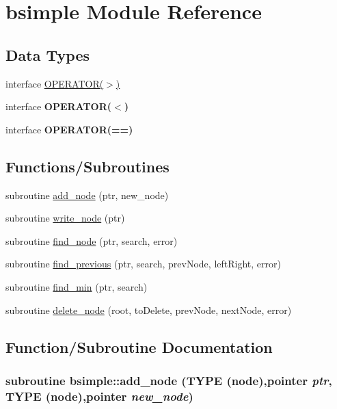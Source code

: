 \hypertarget{namespacebsimple}{
\section{bsimple Module Reference}
\label{namespacebsimple}
}
\subsection*{Data Types}
\begin{DoxyCompactItemize}
\item 
interface \hyperlink{interfacebsimple_1_1OPERATOR_07_4_08}{OPERATOR($>$)}
\item 
interface {\bfseries OPERATOR($<$)}
\item 
interface {\bfseries OPERATOR(==)}
\end{DoxyCompactItemize}
\subsection*{Functions/Subroutines}
\begin{DoxyCompactItemize}
\item 
subroutine \hyperlink{namespacebsimple_a98a0fa9db2215d588a0a87c08065809f}{add\_\-node} (ptr, new\_\-node)
\item 
subroutine \hyperlink{namespacebsimple_ae6c8fc172ff255d4d825b1f507d9fd82}{write\_\-node} (ptr)
\item 
subroutine \hyperlink{namespacebsimple_abe5b608758a905e30ed8661e177395d6}{find\_\-node} (ptr, search, error)
\item 
subroutine \hyperlink{namespacebsimple_a021b297f11aa3649405b7931d0979be9}{find\_\-previous} (ptr, search, prevNode, leftRight, error)
\item 
subroutine \hyperlink{namespacebsimple_a11b24c82d3405b40e38891f5b2de1eeb}{find\_\-min} (ptr, search)
\item 
subroutine \hyperlink{namespacebsimple_a4cb5aa13e4c5a527c7573ccbd5234162}{delete\_\-node} (root, toDelete, prevNode, nextNode, error)
\end{DoxyCompactItemize}


\subsection{Function/Subroutine Documentation}
\hypertarget{namespacebsimple_a98a0fa9db2215d588a0a87c08065809f}{
\subsubsection[{add\_\-node}]{\setlength{\rightskip}{0pt plus 5cm}subroutine bsimple::add\_\-node (TYPE (node),pointer {\em ptr}, \/  TYPE (node),pointer {\em new\_\-node})}}
\label{namespacebsimple_a98a0fa9db2215d588a0a87c08065809f}


